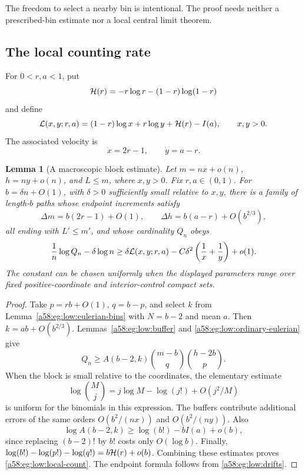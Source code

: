 \documentclass[11pt,letterpaper]{article}
\newtheorem{lemma}[theorem]{Lemma}
\theoremstyle{remark}
\begin{document}
The freedom to select a nearby bin is intentional. The proof needs
neither a prescribed-bin estimate nor a local central limit theorem.

\subsection{The local counting rate}

For \(0<r,a<1\), put
\[
 {\cal H}(r)=-r\log r-(1-r)\log(1-r)
\]
and define
\begin{equation}\label{a58:eg:low:L}
 {\cal L}(x,y;r,a)
 =(1-r)\log x+r\log y+{\cal H}(r)-I(a),
 \qquad x,y>0.
\end{equation}
The associated velocity is
\begin{equation}\label{a58:eg:low:velocity}
 \dot x=2r-1,\qquad \dot y=a-r.
\end{equation}

\begin{lemma}[A macroscopic block estimate]\label{a58:eg:low:local}
Let \(m=nx+o(n)\), \(h=ny+o(n)\), and \(L\le m\), where \(x,y>0\).
Fix \(r,a\in(0,1)\). For \(b=\delta n+O(1)\), with \(\delta>0\)
sufficiently small relative to \(x,y\), there is a family of
length-\(b\) paths whose endpoint increments satisfy
\[
 \Delta m=b(2r-1)+O(1),\qquad
 \Delta h=b(a-r)+O(b^{2/3}),
\]
all ending with \(L'\le m'\), and whose cardinality \(Q_n\) obeys
\begin{equation}\label{a58:eg:low:local-count}
 \frac1n\log Q_n-\delta\log n
 \ge \delta{\cal L}(x,y;r,a)
 -C\delta^2\left(\frac1x+\frac1y\right)+o(1).
\end{equation}
The constant can be chosen uniformly when the displayed parameters
range over fixed positive-coordinate and interior-control compact sets.
\end{lemma}

\begin{proof}
Take \(p=rb+O(1)\), \(q=b-p\), and select \(k\) from
Lemma~\ref{a58:eg:low:eulerian-bins} with \(N=b-2\) and mean \(a\).
Then \(k=ab+O(b^{2/3})\).
Lemmas~\ref{a58:eg:low:buffer} and \eqref{a58:eg:low:ordinary-eulerian} give
\[
 Q_n\ge A(b-2,k)\binom{m-b}{q}\binom{h-2b}{p}.
\]
When the block is small relative to the coordinates, the elementary
estimate
\[
 \log\binom Mj=j\log M-\log(j!)+O(j^2/M)
\]
is uniform for the binomials in this expression.
The buffers contribute additional errors of the same orders
\(O(b^2/(nx))\) and \(O(b^2/(ny))\).
Also
\[
 \log A(b-2,k)\ge \log(b!)-bI(a)+o(b),
\]
since replacing \((b-2)!\) by \(b!\) costs only \(O(\log b)\).
Finally,
\(\log(b!)-\log(p!)-\log(q!)=b{\cal H}(r)+o(b)\).
Combining these estimates proves \eqref{a58:eg:low:local-count}.
The endpoint formula follows from \eqref{a58:eg:low:drifts}.
\end{proof}
\end{document}
